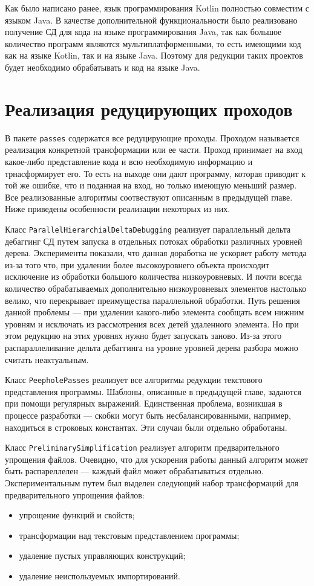 Как было написано ранее, язык программирования Kotlin полностью совместим с языком Java. В качестве дополнительной функциональности было реализовано получение СД для кода на языке программирования Java, так как большое количество программ являются мультиплатформенными, то есть имеющими код как на языке Kotlin, так и на языке Java. Поэтому для редукции таких проектов будет необходимо обрабатывать и код на языке Java. 

\section{Реализация редуцирующих проходов}
В пакете \texttt{passes} содержатся все редуцирующие проходы. Проходом называется реализация конкретной трансформации или ее части. Проход принимает на вход какое-либо представление кода и всю необходимую информацию и трнасформирует его. То есть на выходе они дают программу, которая приводит к той же ошибке, что и поданная на вход, но только имеющую меньший размер. Все реализованные алгоритмы соотвествуют описанным в предыдущей главе. Ниже приведены особенности реализации некоторых из них.

Класс \texttt{ParallelHierarchialDeltaDebugging} реализует параллельный дельта дебаггинг СД путем запуска в отдельных потоках обработки различных уровней дерева. Эксперименты показали, что данная доработка не ускоряет работу метода из-за того что, при удалении более высокоуровнего объекта происходит исключение из обработки большого количества низкоуровневых. И почти всегда количество обрабатываемых дополнительно низкоуровневых элементов настолько велико, что перекрывает преимущества параллельной обработки. Путь решения данной проблемы --- при удалении какого-либо элемента сообщать всем нижним уровням и исключать из рассмотрения всех детей удаленного элемента. Но при этом редукцию на этих уровнях нужно будет запускать заново. Из-за этого распараллеливание дельта дебаггинга на уровне уровней дерева разбора можно считать неактуальным. 

Класс \texttt{PeepholePasses} реализует все алгоритмы редукции текстового представления программы. Шаблоны, описанные в предыдущей главе, задаются при помощи регулярных выражений. Единственная проблема, возникшая в процессе разработки --- скобки могут быть несбалансированными, например, находиться в строковых константах. Эти случаи были отдельно обработаны.

Класс \texttt{PreliminarySimplification} реализует алгоритм предварительного упрощения файлов. Очевидно, что для ускорения работы данный алгоритм может быть распареллелен --- каждый файл может обрабатываться отдельно. Экспериментальным путем был выделен следующий набор трансформаций для предварительного упрощения файлов:
\begin{itemize}
	\item упрощение функций и свойств;
	\item трансформации над текстовым представлением программы;
	\item удаление пустых управляющих конструкций;
	\item удаление неиспользуемых импортирований.
\end{itemize}


